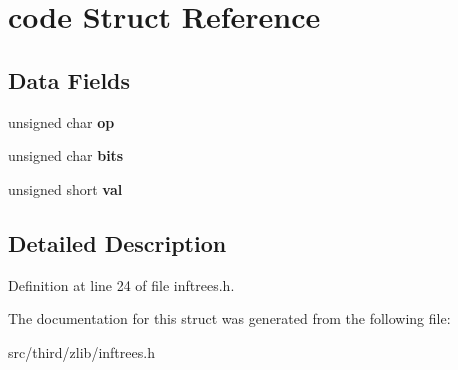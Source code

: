 \hypertarget{structcode}{\section{code Struct Reference}
\label{da/da8/structcode}
}
\subsection*{Data Fields}
\begin{DoxyCompactItemize}
\item 
\hypertarget{structcode_a4f075d73a9177d05cc7d332105295b83}{unsigned char {\bfseries op}}\label{da/da8/structcode_a4f075d73a9177d05cc7d332105295b83}

\item 
\hypertarget{structcode_a5defcebb356dca1a5a8d39995f28d66b}{unsigned char {\bfseries bits}}\label{da/da8/structcode_a5defcebb356dca1a5a8d39995f28d66b}

\item 
\hypertarget{structcode_a6f9c73627997e8fc6df02e620cf9a6f5}{unsigned short {\bfseries val}}\label{da/da8/structcode_a6f9c73627997e8fc6df02e620cf9a6f5}

\end{DoxyCompactItemize}


\subsection{Detailed Description}


Definition at line 24 of file inftrees.\-h.



The documentation for this struct was generated from the following file\-:\begin{DoxyCompactItemize}
\item 
src/third/zlib/inftrees.\-h\end{DoxyCompactItemize}
